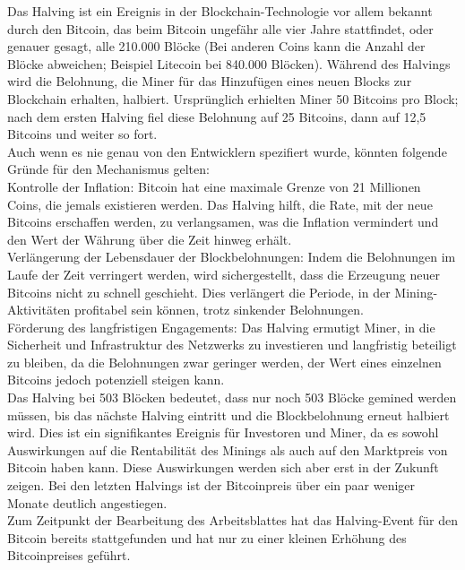 \documentclass[german]{../uebung}
\begin{document}
\begin{exercise}{1.1}

\end{exercise}

\begin{exercise}{1.2}
	Das Halving ist ein Ereignis in der Blockchain-Technologie vor allem bekannt durch den Bitcoin, das beim Bitcoin ungefähr alle vier Jahre stattfindet, oder genauer gesagt, alle 210.000 Blöcke (Bei anderen Coins kann die Anzahl der Blöcke abweichen; Beispiel Litecoin bei 840.000 Blöcken). Während des Halvings wird die Belohnung, die Miner für das Hinzufügen eines neuen Blocks zur Blockchain erhalten, halbiert. Ursprünglich erhielten Miner 50 Bitcoins pro Block; nach dem ersten Halving fiel diese Belohnung auf 25 Bitcoins, dann auf 12,5 Bitcoins und weiter so fort.\\
	Auch wenn es nie genau von den Entwicklern spezifiert wurde, könnten folgende Gründe für den Mechanismus gelten:\\
	Kontrolle der Inflation: Bitcoin hat eine maximale Grenze von 21 Millionen Coins, die jemals existieren werden. Das Halving hilft, die Rate, mit der neue Bitcoins erschaffen werden, zu verlangsamen, was die Inflation vermindert und den Wert der Währung über die Zeit hinweg erhält.\\
	Verlängerung der Lebensdauer der Blockbelohnungen: Indem die Belohnungen im Laufe der Zeit verringert werden, wird sichergestellt, dass die Erzeugung neuer Bitcoins nicht zu schnell geschieht. Dies verlängert die Periode, in der Mining-Aktivitäten profitabel sein können, trotz sinkender Belohnungen.\\
	Förderung des langfristigen Engagements: Das Halving ermutigt Miner, in die Sicherheit und Infrastruktur des Netzwerks zu investieren und langfristig beteiligt zu bleiben, da die Belohnungen zwar geringer werden, der Wert eines einzelnen Bitcoins jedoch potenziell steigen kann.\\
	Das Halving bei 503 Blöcken bedeutet, dass nur noch 503 Blöcke gemined werden müssen, bis das nächste Halving eintritt und die Blockbelohnung erneut halbiert wird. Dies ist ein signifikantes Ereignis für Investoren und Miner, da es sowohl Auswirkungen auf die Rentabilität des Minings als auch auf den Marktpreis von Bitcoin haben kann. Diese Auswirkungen werden sich aber erst in der Zukunft zeigen. Bei den letzten Halvings ist der Bitcoinpreis über ein paar weniger Monate deutlich angestiegen.\\
	Zum Zeitpunkt der Bearbeitung des Arbeitsblattes hat das Halving-Event für den Bitcoin bereits stattgefunden und hat nur zu einer kleinen Erhöhung des Bitcoinpreises geführt.
\end{exercise}
\end{document}
